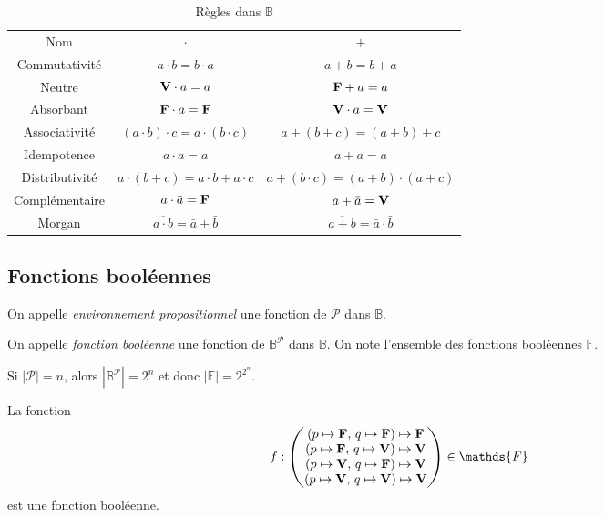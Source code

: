 \begin{rmk}\hbox{}

	\begin{table}[H]
		\centering
		\begin{tabular}{c|c|c}
			{\sc Nom}\/&$\cdot$\/&$+$\/\\
			Commutativité&$a\cdot b = b\cdot a$\/ &$a+b=b+a$\/ \\
			Neutre&${\mathbf{V}}\/ \cdot a = a$\/ & ${\mathbf{F}}\/ + a = a$\/ \\
			Absorbant&${\mathbf{F}}\/ \cdot a = {\mathbf{F}}\/$\/&${\mathbf{V}}\/ \cdot a = {\mathbf{V}}\/$ \\
			Associativité&$(a\cdot b)\cdot c = a\cdot (b\cdot c)$\/ &$a+(b+c)=(a+b)+c$\/ \\
			Idempotence&$a\cdot a = a$\/ & $a + a = a$\/ \\
			Distributivité&$a\cdot (b+c) = a\cdot b + a\cdot c$\/ & $a + (b\cdot c) = (a+b)\cdot (a+c)$\/ \\
			Complémentaire&$a\cdot \bar{a} = {\mathbf{F}}\/$\/&$a+\bar{a} = {\mathbf{V}}\/ $\/ \\
			{\sc Morgan}\/&$\overline{a\cdot b} = \bar{a}+ \bar{b}$\/&$\overline{a+b} = \bar{a}\cdot \bar{b}$\/
		\end{tabular}
		\caption{Règles dans $\mathds{B}$}
	\end{table}
\end{rmk}

\subsection{Fonctions booléennes}

\begin{defn}
	On appelle {\it environnement propositionnel}\/ une fonction de $\mathcal{P}$\/ dans $\mathds{B}$.
\end{defn}

\begin{defn}
	On appelle {\it fonction booléenne}\/ une fonction de $\mathds{B}^{\mathcal{P}}$\/ dans $\mathds{B}$. On note l'ensemble des fonctions booléennes $\mathds{F}$.
\end{defn}

\begin{rmk}
	Si $|\mathcal{P}| = n$, alors $\left| \mathds{B}^{\mathcal{P}} \right| = 2^n$\/ et donc $|\mathds{F}| = 2^{2^n}$.
\end{rmk}

\begin{exm}
	La fonction \[
		f : \begin{pmatrix}
			(p\mapsto {\bfm F},\,q \mapsto {\bfm F}\/)\mapsto {\bfm F}\/\\
			(p\mapsto {\bfm F},\,q \mapsto {\bfm V}\/)\mapsto {\bfm V}\/\\
			(p\mapsto {\bfm V},\,q \mapsto {\bfm F}\/)\mapsto {\bfm V}\/\\
			(p\mapsto {\bfm V},\,q \mapsto {\bfm V}\/)\mapsto {\bfm V}\/\\
		\end{pmatrix} \in \mathds{F}
	\] est une fonction booléenne.
\end{exm}

